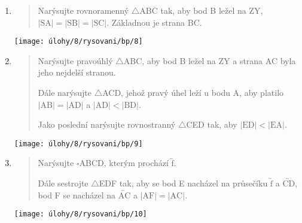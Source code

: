 \begin{enumerate}
\begin{minipage}[t]{\linewidth}
    \end{minipage}

    \item
    \begin{minipage}[t]{\linewidth}
        \begin{quote}
            Narýsujte rovnoramenný $\triangle$ABC tak, aby bod B ležel na $\text{ZY}$, $\lvert \text{SA} \rvert = \lvert \text{SB} \rvert = \lvert \text{SC} \rvert$.
            Základnou je strana BC\@.
        \end{quote}
        \centering
        \texttt{[image: úlohy/8/rysovani/bp/8]}

    \end{minipage}

    \item
    \begin{minipage}[t]{\linewidth}
        \begin{quote}
            Narýsujte pravoúhlý $\triangle$ABC, aby bod B ležel na $\text{ZY}$ a strana AC byla jeho nejdelší stranou.

            Dále narýsujte $\triangle$ACD, jehož pravý úhel leží u bodu A, aby platilo $\lvert \text{AB} \rvert = \lvert \text{AD} \rvert$ a $\lvert \text{AD} \rvert < \lvert \text{BD} \rvert$.

            Jako poslední narýsujte rovnostranný $\triangle$CED tak, aby ${\lvert \text{ED} \rvert < \lvert \text{EA} \rvert}$.
        \end{quote}
        \centering
        \texttt{[image: úlohy/8/rysovani/bp/9]}

    \end{minipage}

    \item
    \begin{minipage}[t]{\linewidth}
        \begin{quote}
            Narýsujte $\square$ABCD, kterým prochází $\overleftrightarrow{\text{f}}$.

            Dále sestrojte $\triangle$EDF tak, aby se bod E nacházel na průsečíku $\overleftrightarrow{\text{f}}$ a $\overleftrightarrow{\text{CD}}$, bod F se nacházel na $\overleftrightarrow{\text{AC}}$ a $\lvert \text{AF} \rvert = \lvert \text{AC} \rvert$.
        \end{quote}
        \centering
        \texttt{[image: úlohy/8/rysovani/bp/10]}

    \end{minipage}


\end{enumerate}
